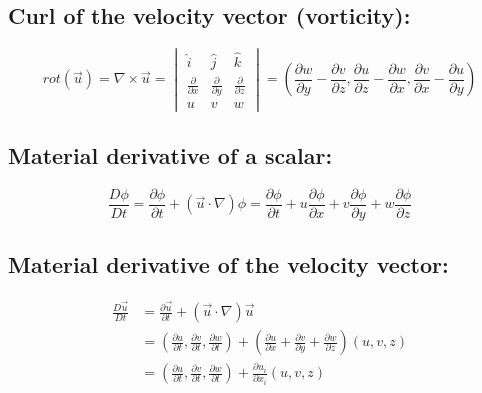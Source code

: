 \documentclass{article}
\begin{document}
\subsection{Curl of the velocity vector (vorticity):}
    \begin{equation}
        rot(\vec{u}) = \nabla \times \vec{u} = 
        \begin{vmatrix}
        \hat{i} & \hat{j} & \hat{k} \\
        \frac{\partial}{\partial x} & \frac{\partial}{\partial y} & \frac{\partial}{\partial z} \\
        u & v & w
        \end{vmatrix}
    = \left( \frac{\partial w}{\partial y} - \frac{\partial v}{\partial z}, \frac{\partial u}{\partial z} - \frac{\partial w}{\partial x}, \frac{\partial v}{\partial x} - \frac{\partial u}{\partial y} \right)
    \end{equation}
\subsection{Material derivative of a scalar:}
    \begin{equation}
        \frac{D\phi}{Dt} = \frac{\partial \phi}{\partial t} + (\vec{u} \cdot \nabla) \phi = \frac{\partial \phi}{\partial t} + u \frac{\partial \phi}{\partial x} + v \frac{\partial \phi}{\partial y} + w \frac{\partial \phi}{\partial z}
    \end{equation}
\subsection{Material derivative of the velocity vector:}
    \begin{equation}
        \begin{aligned}
        \frac{D\vec{u}}{Dt} &= \frac{\partial \vec{u}}{\partial t} + (\vec{u} \cdot \nabla) \vec{u} \\
        &= \left(\frac{\partial u}{\partial t}, \frac{\partial v}{\partial t}, \frac{\partial w}{\partial t}\right) + \left(\frac{\partial u}{\partial x} + \frac{\partial v}{\partial y} + \frac{\partial w}{\partial z}\right) \left(u, v, z\right) \\
        &= \left(\frac{\partial u}{\partial t}, \frac{\partial v}{\partial t}, \frac{\partial w}{\partial t}\right) + \frac{\partial u_i}{\partial x_i} \left(u, v, z\right)
        \end{aligned}
    \end{equation}
\end{document}
